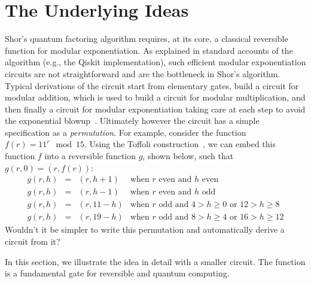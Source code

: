 \section{The Underlying Ideas}



Shor's quantum factoring algorithm requires, at its core, a classical reversible function for modular exponentiation. As
explained in standard accounts of the algorithm (e.g., the Qiskit implementation), such efficient modular exponentiation
circuits are not straightforward and are the bottleneck in Shor’s algorithm. Typical derivations of the circuit start
from elementary gates, build a circuit for modular addition, which is used to build a circuit for modular
multiplication, and then finally a circuit for modular exponentiation taking care at each step to avoid the exponential
blowup~\cite{shorefficient}. Ultimately however the circuit has a simple specification as a \emph{permutation}. For
example, consider the function $f(r) = 11^{r} \mod 15$. Using the Toffoli construction~\cite{Toffoli:1980}, we can embed
this function $f$ into a reversible function $g$, shown below, such that $g(r,0) = (r,f(r))$:
\[\begin{array}{rcll}
g(r,h) &=& (r,h+1) & \mbox{when~$r$~even~and~$h$~even} \\
g(r,h) &=& (r,h-1) & \mbox{when~$r$~even~and~$h$~odd} \\
g(r,h) &=& (r,11-h) & \mbox{when~$r$~odd~and~$4 > h \geq 0$~or~$12 > h \geq 8$} \\
g(r,h) &=& (r,19-h) & \mbox{when~$r$~odd~and~$8 > h \geq 4$~or~$16 > h \geq 12$}
\end{array}\]
Wouldn't it be simpler to write this permutation and automatically derive a circuit from it?


In this section, we illustrate the idea in detail with a smaller circuit. The  function is a fundamental gate
for reversible and quantum computing.



